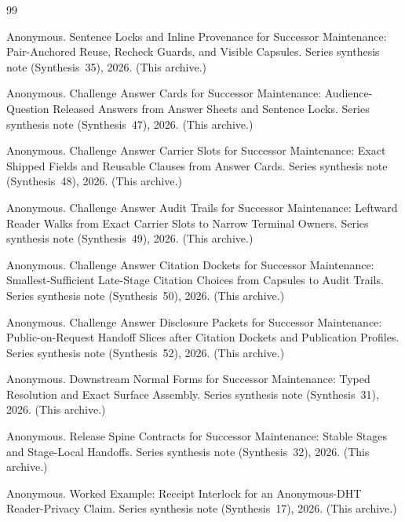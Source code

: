 \documentclass[11pt]{article}
\begin{document}
\begin{thebibliography}{99}\small

Anonymous.
\newblock Sentence Locks and Inline Provenance for Successor Maintenance: Pair-Anchored Reuse, Recheck Guards, and Visible Capsules.
\newblock Series synthesis note (Synthesis~35), 2026. (This archive.)

Anonymous.
\newblock Challenge Answer Cards for Successor Maintenance: Audience-Question Released Answers from Answer Sheets and Sentence Locks.
\newblock Series synthesis note (Synthesis~47), 2026. (This archive.)

Anonymous.
\newblock Challenge Answer Carrier Slots for Successor Maintenance: Exact Shipped Fields and Reusable Clauses from Answer Cards.
\newblock Series synthesis note (Synthesis~48), 2026. (This archive.)

Anonymous.
\newblock Challenge Answer Audit Trails for Successor Maintenance: Leftward Reader Walks from Exact Carrier Slots to Narrow Terminal Owners.
\newblock Series synthesis note (Synthesis~49), 2026. (This archive.)

Anonymous.
\newblock Challenge Answer Citation Dockets for Successor Maintenance: Smallest-Sufficient Late-Stage Citation Choices from Capsules to Audit Trails.
\newblock Series synthesis note (Synthesis~50), 2026. (This archive.)

Anonymous.
\newblock Challenge Answer Disclosure Packets for Successor Maintenance: Public-on-Request Handoff Slices after Citation Dockets and Publication Profiles.
\newblock Series synthesis note (Synthesis~52), 2026. (This archive.)

Anonymous.
\newblock Downstream Normal Forms for Successor Maintenance: Typed Resolution and Exact Surface Assembly.
\newblock Series synthesis note (Synthesis~31), 2026. (This archive.)

Anonymous.
\newblock Release Spine Contracts for Successor Maintenance: Stable Stages and Stage-Local Handoffs.
\newblock Series synthesis note (Synthesis~32), 2026. (This archive.)

Anonymous.
\newblock Worked Example: Receipt Interlock for an Anonymous-DHT Reader-Privacy Claim.
\newblock Series synthesis note (Synthesis~17), 2026. (This archive.)



\end{thebibliography}
\end{document}
